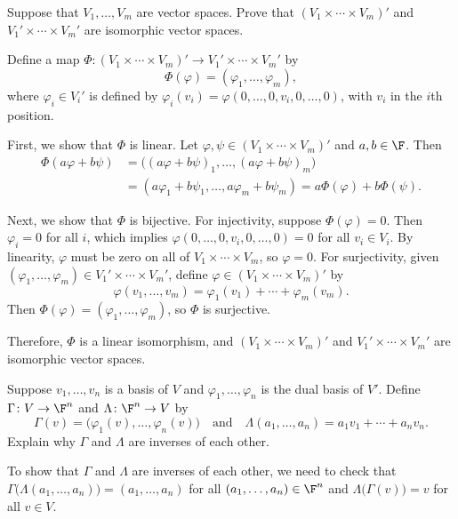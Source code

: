 \begin{exc}
\begin{exercise}
Suppose that $V_1,\dots,V_m$ are vector spaces. Prove that
$(V_1\times\cdots\times V_m)'$ and ${V_1}'\times\cdots\times{V_m}'$ are
isomorphic vector spaces.
\end{exercise}
\begin{solution}
Define a map
$\Phi\colon(V_1\times\cdots\times V_m)'\to{V_1}'\times\cdots\times{V_m}'$ by
\[ \Phi(\varphi) = (\varphi_1,\dots,\varphi_m), \]
where $\varphi_i\in{V_i}'$ is defined by
$\varphi_i(v_i)=\varphi(0,\dots,0,v_i,0,\dots,0)$, with $v_i$ in the
$i$th position.

First, we show that $\Phi$ is linear. Let
$\varphi,\psi\in(V_1\times\cdots\times V_m)'$ and $a,b\in\F$. Then
\begin{align*}
\Phi(a\varphi+b\psi)
 &= \bigl((a\varphi+b\psi)_1,\dots,(a\varphi+b\psi)_m\bigr)\\
 &= (a\varphi_1+b\psi_1,\dots,a\varphi_m+b\psi_m) = a\Phi(\varphi)+b\Phi(\psi).
\end{align*}

Next, we show that $\Phi$ is bijective. For injectivity, suppose
$\Phi(\varphi)=0$. Then $\varphi_i=0$ for all $i$, which implies
$\varphi(0,\dots,0,v_i,0,\dots,0)=0$ for all $v_i\in V_i$. By linearity,
$\varphi$ must be zero on all of $V_1\times\cdots\times V_m$, so $\varphi=0$.
For surjectivity, given
$(\varphi_1,\dots,\varphi_m)\in{V_1}'\times\cdots\times{V_m}'$, define
$\varphi\in(V_1\times\cdots\times V_m)'$ by
\[ \varphi(v_1,\dots,v_m) = \varphi_1(v_1)+\cdots+\varphi_m(v_m). \]
Then $\Phi(\varphi)=(\varphi_1,\dots,\varphi_m)$, so $\Phi$ is surjective.

Therefore, $\Phi$ is a linear isomorphism, and $(V_1\times\cdots\times V_m)'$
and ${V_1}'\times\cdots\times{V_m}'$ are isomorphic vector spaces.
\end{solution}

\begin{exercise}
Suppose $v_1,\dots,v_n$ is a basis of $V$ and $\varphi_1,\dots,\varphi_n$ is the
dual basis of $V'$. Define $\Gamma\colon V\to\F^n$ and $\Lambda\colon\F^n\to V$
by
\[ \Gamma(v) = \bigl(\varphi_1(v),\dots,\varphi_n(v)\bigr) \quad\text{and}\quad
   \Lambda(a_1,\dots,a_n) = a_1v_1+\cdots+a_nv_n. \]
Explain why $\Gamma$ and $\Lambda$ are inverses of each other.
\end{exercise}
\begin{solution}
To show that $\Gamma$ and $\Lambda$ are inverses of each other, we need to check
that $\Gamma\bigl(\Lambda(a_1,\dots,a_n)\bigr)=(a_1,\dots,a_n)$ for all
$(a_1,\dots,a_n)\in\F^n$ and $\Lambda\bigl(\Gamma(v)\bigr)=v$ for all $v\in V$.


\end{solution}
\end{exc}
